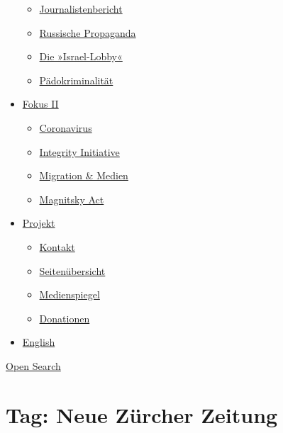 \begin{itemize}
  \begin{itemize}
  \tightlist
  \item
    \href{https://swprs.org/bericht-eines-journalisten/}{Journalistenbericht}
  \item
    \href{https://swprs.org/russische-propaganda/}{Russische Propaganda}
  \item
    \href{https://swprs.org/die-israel-lobby-fakten-und-mythen/}{Die
    »Israel-Lobby«}
  \item
    \href{https://swprs.org/geopolitik-und-paedokriminalitaet/}{Pädokriminalität}
  \end{itemize}
\item
  \href{https://swprs.org/migration-und-medien/}{Fokus II}

  \begin{itemize}
  \tightlist
  \item
    \href{https://swprs.org/covid-19-hinweis-ii/}{Coronavirus}
  \item
    \href{https://swprs.org/die-integrity-initiative/}{Integrity
    Initiative}
  \item
    \href{https://swprs.org/migration-und-medien/}{Migration \& Medien}
  \item
    \href{https://swprs.org/der-fall-magnitsky/}{Magnitsky Act}
  \end{itemize}
\item
  \href{https://swprs.org/kontakt/}{Projekt}

  \begin{itemize}
  \tightlist
  \item
    \href{https://swprs.org/kontakt/}{Kontakt}
  \item
    \href{https://swprs.org/uebersicht/}{Seitenübersicht}
  \item
    \href{https://swprs.org/medienspiegel/}{Medienspiegel}
  \item
    \href{https://swprs.org/donationen/}{Donationen}
  \end{itemize}
\item
  \href{https://swprs.org/contact/}{English}
\end{itemize}

\protect\hyperlink{}{Open Search}

\hypertarget{tag-neue-zuxfcrcher-zeitung}{%
\section{Tag: Neue Zürcher Zeitung}\label{tag-neue-zuxfcrcher-zeitung}}

